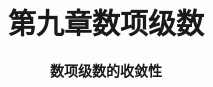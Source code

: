 


\title[数学分析]{\texorpdfstring{\LARGE \bfseries 第九章\quad 数项级数}{第九章 数项级数}} %
\author[数项级数] %
{\Large \bfseries 数项级数的收敛性}
\date{}





\begin{frame}

\titlepage %

\end{frame}





